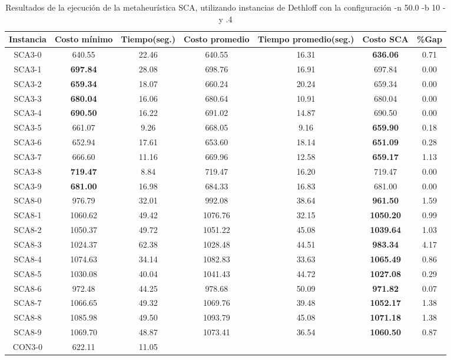 \begin{table}[ht]
\caption{Resultados de la ejecución de la metaheurística SCA, utilizando instancias de Dethloff con la configuración -n 50.0 -b 10 -y .4}
\centering
\small
\begin{tabular}{c c c c c c c}
\hline\hline
Instancia & Costo mínimo & Tiempo(seg.) & Costo promedio & Tiempo promedio(seg.) & Costo SCA & \%Gap \\ [0.5ex]
\hline
SCA3-0 & 640.55 & 22.46 & 
640.55 & 16.31 & \bf{636.06} & 
0.71\\SCA3-1 & \bf{697.84} & 28.08 & 
698.76 & 16.91 & 697.84 & 0.00\\
SCA3-2 & \bf{659.34} & 18.07 & 
660.24 & 20.24 & 659.34 & 0.00\\
SCA3-3 & \bf{680.04} & 16.06 & 
680.64 & 10.91 & 680.04 & 0.00\\
SCA3-4 & \bf{690.50} & 16.22 & 
691.02 & 14.87 & 690.50 & 0.00\\
SCA3-5 & 661.07 & 9.26 & 
668.05 & 9.16 & \bf{659.90} & 
0.18\\SCA3-6 & 652.94 & 17.61 & 
653.60 & 18.14 & \bf{651.09} & 
0.28\\SCA3-7 & 666.60 & 11.16 & 
669.96 & 12.58 & \bf{659.17} & 
1.13\\SCA3-8 & \bf{719.47} & 8.84 & 
719.47 & 16.20 & 719.47 & 0.00\\
SCA3-9 & \bf{681.00} & 16.98 & 
684.33 & 16.83 & 681.00 & 0.00\\
SCA8-0 & 976.79 & 32.01 & 
992.08 & 38.64 & \bf{961.50} & 
1.59\\SCA8-1 & 1060.62 & 49.42 & 
1076.76 & 32.15 & \bf{1050.20} & 
0.99\\SCA8-2 & 1050.37 & 49.72 & 
1051.22 & 45.08 & \bf{1039.64} & 
1.03\\SCA8-3 & 1024.37 & 62.38 & 
1028.48 & 44.51 & \bf{983.34} & 
4.17\\SCA8-4 & 1074.63 & 34.14 & 
1082.83 & 33.63 & \bf{1065.49} & 
0.86\\SCA8-5 & 1030.08 & 40.04 & 
1041.43 & 44.72 & \bf{1027.08} & 
0.29\\SCA8-6 & 972.48 & 44.25 & 
978.68 & 50.09 & \bf{971.82} & 
0.07\\SCA8-7 & 1066.65 & 49.32 & 
1069.76 & 39.48 & \bf{1052.17} & 
1.38\\SCA8-8 & 1085.98 & 49.50 & 
1093.79 & 45.08 & \bf{1071.18} & 
1.38\\SCA8-9 & 1069.70 & 48.87 & 
1073.41 & 36.54 & \bf{1060.50} & 
0.87\\CON3-0 & 622.11 & 11.05 & 

\end{tabular}
\end{table}
